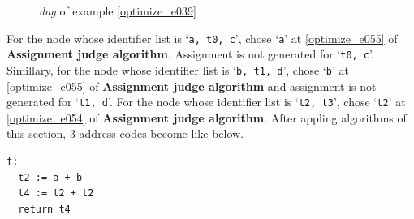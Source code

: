 \begin{Example}
\begin{figure}[htbp]
\begin{center}
\begin{latexonly}
\end{latexonly}
\caption{{\em dag} of example \ref{optimize_e039}}
\label{optimize_e040}
\end{center}
\end{figure}
For the node whose identifier list is `{\tt{a, t0, c}}',
chose `{\tt{a}}' at \ref{optimize_e055} of {\bf Assignment judge algorithm}.
Assignment is not generated for `{\tt{t0, c}}'.
Simillary, for the node whose identifier list is `{\tt{b, t1, d}}',
chose `{\tt{b}}' at \ref{optimize_e055}
of {\bf Assignment judge algorithm} and
assignment is not generated for `{\tt{t1, d}}'.
For the node whose identifier list is `{\tt{t2, t3}}',
chose `{\tt{t2}}' at \ref{optimize_e054}
of {\bf Assignment judge algorithm}.
After appling algorithms of this section,
3 address codes become like below.
\begin{verbatim}
f:
  t2 := a + b
  t4 := t2 + t2
  return t4
\end{verbatim}
\end{Example}

